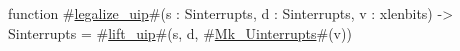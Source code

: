 function #\hyperref[sailRISCVzlegalizzezyuip]{legalize\_uip}#(s : Sinterrupts, d : Sinterrupts, v : xlenbits) -> Sinterrupts = {
  #\hyperref[sailRISCVzliftzyuip]{lift\_uip}#(s, d, #\hyperref[sailRISCVzMkzyUinterrupts]{Mk\_Uinterrupts}#(v))
}
